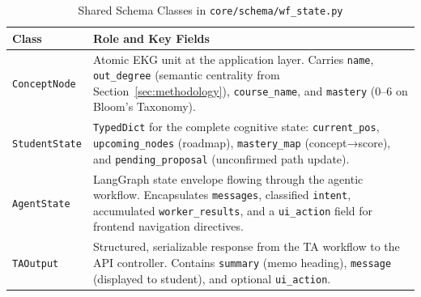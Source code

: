 \begin{table}[H]
\centering
\caption{Shared Schema Classes in \texttt{core/schema/wf\_state.py}}\label{tab:schemas}
\begin{tabular}{p{2.8cm} p{9.5cm}}
\hline
{Class} & {Role and Key Fields} \\
\hline
\texttt{ConceptNode}   & Atomic EKG unit at the application layer. Carries \texttt{name}, \texttt{out\_degree} (semantic centrality from Section~\ref{sec:methodology}), \texttt{course\_name}, and \texttt{mastery} (0--6 on Bloom's Taxonomy). \\
\texttt{StudentState}  & \texttt{TypedDict} for the complete cognitive state: \texttt{current\_pos}, \texttt{upcoming\_nodes} (roadmap), \texttt{mastery\_map} (concept→score), and \texttt{pending\_proposal} (unconfirmed path update). \\
\texttt{AgentState}    & LangGraph state envelope flowing through the agentic workflow. Encapsulates \texttt{messages}, classified \texttt{intent}, accumulated \texttt{worker\_results}, and a \texttt{ui\_action} field for frontend navigation directives. \\
\texttt{TAOutput}      & Structured, serializable response from the TA workflow to the API controller. Contains \texttt{summary} (memo heading), \texttt{message} (displayed to student), and optional \texttt{ui\_action}. \\
\hline
\end{tabular}
\end{table}
